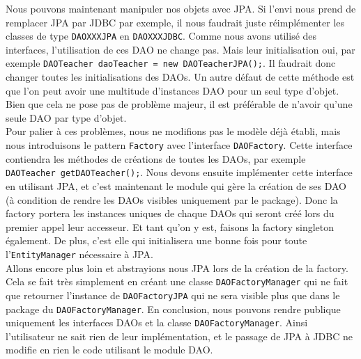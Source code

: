 \documentclass{article}
\begin{document}
Nous pouvons maintenant manipuler nos objets avec JPA. Si l'envi nous prend de remplacer JPA par JDBC par exemple, il nous faudrait juste réimplémenter les classes de type \texttt{DAOXXXJPA} en \texttt{DAOXXXJDBC}. Comme nous avons utilisé des interfaces, l'utilisation de ces DAO ne change pas. Mais leur initialisation oui, par exemple \texttt{DAOTeacher daoTeacher = new DAOTeacherJPA();}. Il faudrait donc changer toutes les initialisations des DAOs. Un autre défaut de cette méthode est que l'on peut avoir une multitude d'instances DAO pour un seul type d'objet. Bien que cela ne pose pas de problème majeur, il est préférable de n'avoir qu'une seule DAO par type d'objet. \\
Pour palier à ces problèmes, nous ne modifions pas le modèle déjà établi, mais nous introduisons le pattern \texttt{Factory} avec l'interface \texttt{DAOFactory}. Cette interface contiendra les méthodes de créations de toutes les DAOs, par exemple \texttt{DAOTeacher getDAOTeacher();}. Nous devons ensuite implémenter cette interface en utilisant JPA, et c'est maintenant le module qui gère la création de ses DAO (à condition de rendre les DAOs visibles uniquement par le package). Donc la factory portera les instances uniques de chaque DAOs qui seront créé lors du premier appel leur accesseur. Et tant qu'on y est, faisons la factory singleton également. De plus, c'est elle qui initialisera une bonne fois pour toute l'\texttt{EntityManager} nécessaire à JPA. \\
Allons encore plus loin et abstrayions nous JPA lors de la création de la factory. Cela se fait très simplement en créant une classe \texttt{DAOFactoryManager} qui ne fait que retourner l'instance de \texttt{DAOFactoryJPA} qui ne sera visible plus que dans le package du \texttt{DAOFactoryManager}. En conclusion, nous pouvons rendre publique uniquement les interfaces DAOs et la classe \texttt{DAOFactoryManager}. Ainsi l'utilisateur ne sait rien de leur implémentation, et le passage de JPA à JDBC ne modifie en rien le code utilisant le module DAO.
\end{document}

